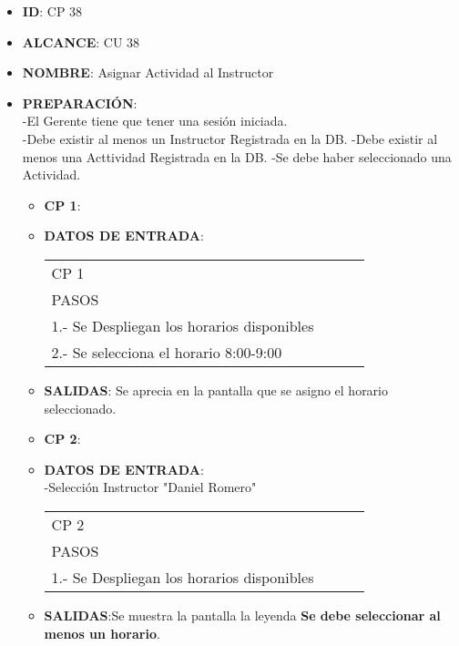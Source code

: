 \begin{itemize}
\item \textbf{ID}: CP 38
\item \textbf{ALCANCE}: CU 38
\item \textbf{NOMBRE}: Asignar Actividad al Instructor
\item \textbf{PREPARACIÓN}:\\
		-El Gerente tiene que tener una sesión iniciada.\\
		-Debe existir al menos un Instructor Registrada en la DB.
		-Debe existir al menos una Acttividad Registrada en la DB.
		-Se debe haber seleccionado una Actividad.
\begin{itemize}
\item \textbf{CP 1}:
\item \textbf{DATOS DE ENTRADA}:\\
	\begin{center}			
	\begin{tabular}{||l|l|l|l||}
		\hline
		\hline
			CP 1\\
			PASOS\\
			\hline 1.- Se Despliegan los horarios disponibles\\
			\hline 2.- Se selecciona el horario 8:00-9:00\\
        \hline
		\hline
	\end{tabular}
	\end{center}
\item \textbf{SALIDAS}: Se aprecia en la pantalla que se asigno el horario seleccionado.
\end{itemize}
\begin{itemize}
\item \textbf{CP 2}:
\item \textbf{DATOS DE ENTRADA}:\\
-Selección Instructor "Daniel Romero"
	\begin{center}			
	\begin{tabular}{||l|l|l|l||}
		\hline
		\hline
			CP 2\\
			PASOS\\
			\hline 1.- Se Despliegan los horarios disponibles\\
        \hline
		\hline
	\end{tabular}
	\end{center}
\item \textbf{SALIDAS}:Se muestra la pantalla  la leyenda \textbf{Se debe seleccionar al menos un horario}.
\end{itemize}
\end{itemize}

